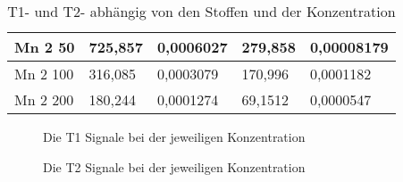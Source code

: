 \begin{table}[H]
\begin{tabular}{lllll}
    \multicolumn{1}{|l|}{Mn 2 50}     & \multicolumn{1}{l|}{725,857} & \multicolumn{1}{l|}{0,0006027} & \multicolumn{1}{l|}{279,858} & \multicolumn{1}{l|}{0,00008179} \\ \hline
    \multicolumn{1}{|l|}{Mn 2 100}    & \multicolumn{1}{l|}{316,085} & \multicolumn{1}{l|}{0,0003079} & \multicolumn{1}{l|}{170,996} & \multicolumn{1}{l|}{0,0001182}  \\ \hline
    \multicolumn{1}{|l|}{Mn 2 200}    & \multicolumn{1}{l|}{180,244} & \multicolumn{1}{l|}{0,0001274} & \multicolumn{1}{l|}{69,1512} & \multicolumn{1}{l|}{0,0000547}  \\ \hline
    \end{tabular}
    \caption{T1- und T2- abhängig von den Stoffen und der Konzentration}
    \end{table}

    \begin{figure}[H]
        \centering
        
        \caption{Die T1 Signale bei der jeweiligen Konzentration}
    \end{figure}
    
    \begin{figure}[H]
        \centering
        
        \caption{Die T2 Signale bei der jeweiligen Konzentration}
    \end{figure}